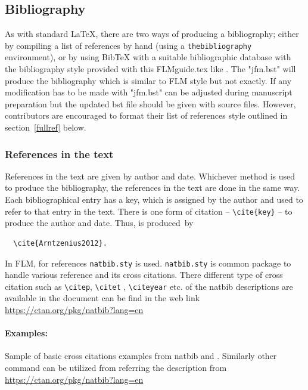 \documentclass[lineno]{JFM-FLM_Au}
\begin{document}
\subsection{Bibliography}

As with standard LaTeX, there are two ways of producing a bibliography; either by compiling a list of references by hand (using a \verb"thebibliography" environment), or by using BibTeX with a suitable bibliographic database with the bibliography style provided with this FLMguide.tex like \verb"". The "jfm.bst" will produce the bibliography which is similar to FLM style but not exactly. If any modification has to be made with "jfm.bst" can be adjusted during manuscript preparation but the updated bst file should be given with source files. However, contributors are encouraged to format their list of references style outlined in section~\ref{fullref} below.

\subsubsection{References in the text}

References in the text are given by author and date.
Whichever method is used to produce the bibliography, the references in
the text are done in the same way. Each bibliographical entry has a key,
which is assigned by the author and used to refer to that entry in the
text. There is one form of citation -- \verb"\cite{key}" -- to produce the
author and date. Thus, \cite{Arntzenius2012} is produced~by
\begin{verbatim}
  \cite{Arntzenius2012}.
\end{verbatim}

In FLM, for references \verb"natbib.sty" is used. \verb"natbib.sty" is common
package to handle various reference and its cross citations. There different
type of cross citation such as \verb"\citep",  \verb"\citet" , \verb"\citeyear"
etc. of the natbib descriptions are available in the document can be find in the web
link \url{https://ctan.org/pkg/natbib?lang=en}

\paragraph{Examples:}

Sample of basic cross citations examples from natbib \citep{Arntzenius2012} and \citet{Arntzenius2012}. Similarly other command can be utilized from referring the description from \url{https://ctan.org/pkg/natbib?lang=en}
\end{document}
